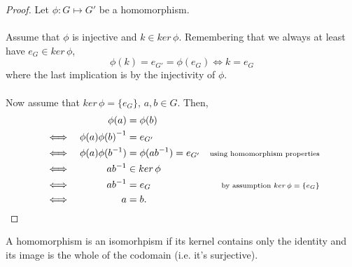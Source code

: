 \documentclass[MathsNotesBase.tex]{subfiles}
\begin{document}
{		
		\begin{proof}
			Let ${ \phi: G \longmapsto G' }$ be a homomorphism.\\\\
			Assume that $\phi$ is injective and ${ k \in ker\,\phi }$. Remembering that we always at least have ${ e_G \in ker\,\phi }$,
			\[ \phi(k) = e_{G'} = \phi(e_G) \iff k = e_G \]
			where the last implication is by the injectivity of $\phi$.\\\\
			Now assume that ${ ker\,\phi = \{e_G\},\, a,b \in G }$. Then,
			\begin{align*}
			&& \phi(a) &= \phi(b) &  \\
			&\iff & \phi(a){\phi(b)}^{-1} &= e_{G'} & \\
			&\iff & \phi(a)\phi({b}^{-1}) &= \phi(a{b}^{-1}) = e_{G'} &\text{\scriptsize{using homomorphism properties}} \\
			&\iff & a{b}^{-1} &\in ker\,\phi &\text{\scriptsize{}} \\
			&\iff & a{b}^{-1} &= e_G &\text{\scriptsize{by assumption ${ ker\,\phi = \{e_G\} }$}} \\
			&\iff & a &= b.  &\qedhere \\
			\end{align*}		
		\end{proof}
		
		\begin{corollary}
			A homomorphism is an isomorhpism if its kernel contains only the identity and its image is the whole of the codomain (i.e. it's surjective). 
		\end{corollary}
	
}
\end{document}
